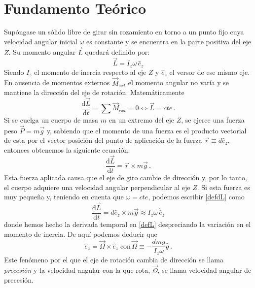 \documentclass[a4paper]{article}
\begin{document}
\section{Fundamento Teórico}
Supóngase un sólido libre de girar sin rozamiento en torno a un punto fijo cuya velocidad angular inicial $\omega$ es constante y se encuentra en la parte positiva del eje $Z$. Su momento angular $\vec{L}$ quedará definido por:
\begin{equation}
\label{defL}
\vec{L}=I_z \omega\, \hat{e}_{z}
\end{equation}
Siendo $I_z$ el momento de inercia respecto al eje $Z$ y $\hat{e}_{z}$ el versor de ese mismo eje. En ausencia de momentos externos $\vec{M}_{ext}$	el momento angular no varía y se mantiene la dirección del eje de rotación. Matemáticamente
\begin{equation}
\frac{\mathrm{d}\vec{L}}{\mathrm{d}t}=\sum \vec{M}_{ext} =0\Leftrightarrow\vec{L}=cte\,.
\end{equation}
Si se cuelga un cuerpo de masa $m$ en un extremo del eje $Z$, se ejerce una fuerza peso $\vec{P}=m\vec{g}$ y, sabiendo que el momento de una fuerza es el producto vectorial de esta por el vector posición del punto de aplicación de la fuerza $\vec{r}\equiv d\hat{e}_z$, entonces obtenemos la siguiente ecuación: 
\begin{equation}
\label{defdL}
\frac{\mathrm{d}\vec{L}}{\mathrm{d}t}=\vec{r}\times m\vec{g}\,.
\end{equation}
Esta fuerza aplicada causa que el eje de giro cambie de dirección y, por lo tanto, el cuerpo adquiere una velocidad angular perpendicular al eje $Z$. Si esta fuerza es muy pequeña y, teniendo en cuenta que $\omega=cte$, podemos escribir \ref{defdL} como 
\begin{equation}
\frac{\mathrm{d}\vec{L}}{\mathrm{d}t}=d\hat{e}_z\times m\vec{g}\approx I_z \omega\, \dot{\hat{e}}_{z}
\end{equation}
donde hemos hecho la derivada temporal en \ref{defL} despreciando la variación en el momento de inercia. De aquí podemos deducir que 
\begin{equation}
\label{defOmega}
\dot{\hat{e}}_{z}=\vec{\Omega}\times \hat{e}_z\;\text{con}\,\vec{\Omega}\equiv -\frac{dmg}{I_z\omega}\hat{g}\,.
\end{equation}
Este fenómeno por el que el eje de rotación cambia de dirección se llama \textit{precesión} y la velocidad angular con la que rota, $\vec{\Omega}$, se llama velocidad angular de precesión.
\end{document}
